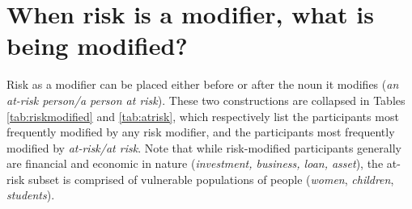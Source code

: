 			\section{When risk is a modifier, what is being modified?}
			\FloatBarrier

			Risk as a modifier can be placed either before or after the noun it modifies (\emph{an at-risk person\slash a person at risk}). These two constructions are collapsed in Tables \ref{tab:riskmodified} and \ref{tab:atrisk}, which respectively list the participants most frequently modified by any risk modifier, and the participants most frequently modified by \emph{at-risk\slash at risk}. Note that while risk-modified participants generally are financial and economic in nature (\emph{investment, business, loan, asset}), the at-risk subset is comprised of vulnerable populations of people (\emph{women}, \emph{children}, \emph{students}).

